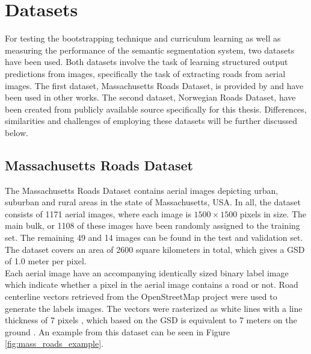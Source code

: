 \section{Datasets}
\label{sec:datasets}
For testing the bootstrapping technique and curriculum learning as well as measuring the performance of the semantic segmentation system, two datasets have been used. Both datasets involve the task of learning structured output predictions from images, specifically the task of extracting roads from aerial images. The first dataset, Massachusetts Roads Dataset, is provided by \cite{MnihThesis} and have been used in other works. The second dataset, Norwegian Roads Dataset, have been created from publicly available source specifically for this thesis. Differences, similarities and challenges of employing these datasets will be further discussed below.\\

\subsection{Massachusetts Roads Dataset}
The Massachusetts Roads Dataset contains aerial images depicting urban, suburban and rural areas in the state of Massachusetts, USA. In all, the dataset consists of 1171 aerial images, where each image is $1500\times 1500$ pixels in size. The main bulk, or 1108 of these images have been randomly assigned to the training set. The remaining 49 and 14 images can be found in the test and validation set. The dataset covers an area of 2600 square kilometers in total, which gives a \ac{GSD} of 1.0 meter per pixel.\\

Each aerial image have an accompanying identically sized binary label image which indicate whether a pixel in the aerial image contains a road or not. Road centerline vectors retrieved from the OpenStreetMap project were used to generate the labels images. The vectors were rasterized as white lines with a line thickness of 7 pixels \citep{MnihThesis}, which based on the \ac{GSD} is equivalent to 7 meters on the ground . An example from this dataset can be seen in Figure \ref{fig:mass_roads_example}.\\

